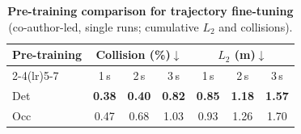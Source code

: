 \begin{table}[t]
  \centering
  \caption[Pre-training comparison for trajectory fine-tuning]{\textbf{Pre-training comparison for trajectory fine-tuning} (co-author-led, single runs; cumulative $L_2$ and collisions).}
  \label{occnet:tab:planning_pretrain}
  \footnotesize
  \begin{tabular}{lcccccc}
    \toprule
    \multirow{2}{*}{Pre-training} & \multicolumn{3}{c}{Collision (\%)$\downarrow$} & \multicolumn{3}{c}{$L_2$ (m)$\downarrow$} \\
    \cmidrule(lr){2-4}\cmidrule(lr){5-7}
     & 1\,s & 2\,s & 3\,s & 1\,s & 2\,s & 3\,s \\
    \midrule
    Det & \textbf{0.38} & \textbf{0.40} & \textbf{0.82} & \textbf{0.85} & \textbf{1.18} & \textbf{1.57} \\
    Occ & 0.47 & 0.68 & 1.03 & 0.93 & 1.26 & 1.70 \\
    \bottomrule
  \end{tabular}
\end{table}

